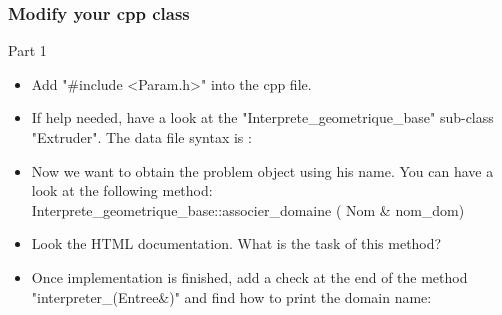 \documentclass[10pt, hyperref={unicode=true,pdfusetitle, bookmarks=true,bookmarksnumbered=false,bookmarksopen=false, breaklinks=false,pdfborder={0 0 1},backref=true,colorlinks=true,linkcolor=darkblue,pageanchor, urlcolor=darkblue}]{beamer}
\begin{document}
\begin{frame}
\frametitle{Modify your cpp class}
\begin{block}{Part 1}

\begin{itemize}
\item Add "\#include <Param.h>" into the cpp file.

\item If help needed, have a look at the "Interprete\_geometrique\_base" sub-class "Extruder". The data file syntax is :
\begin{center}
\end{center}

\item Now we want to obtain the problem object using his name. You can have a look at the following method: \\
Interprete\_geometrique\_base::associer\_domaine ( Nom \& nom\_dom)

\item Look the HTML documentation. What is the task of this method?

\item Once implementation is finished, add a check at the end of the method
"interpreter\_(Entree\&)" and find how to print the domain name:
\begin{center}
\end{center}
\end{itemize}

\end{block}
\end{frame}
\end{document}
